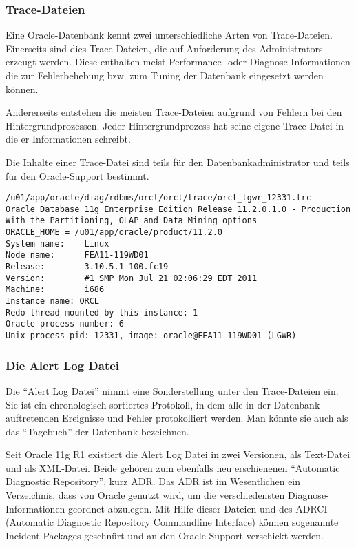           \subsubsection{Trace-Dateien}
            Eine Oracle-Datenbank kennt zwei unterschiedliche Arten von Trace-Dateien. Einerseits sind dies Trace-Dateien, die auf Anforderung des Administrators erzeugt werden. Diese enthalten meist Performance- oder Diagnose-Informationen die zur Fehlerbehebung bzw. zum Tuning der Datenbank eingesetzt werden können.

            Andererseits entstehen die meisten Trace-Dateien aufgrund von Fehlern bei den Hintergrundprozessen. Jeder Hintergrundprozess hat seine eigene Trace-Datei in die er Informationen schreibt.

						Die Inhalte einer Trace-Datei sind teils für den Datenbankadministrator und teils für den Oracle-Support bestimmt.
\clearpage
            \begin{lstlisting}[caption={Eine Tracedatei des Log Writers},
            label=orcl_lgwr_12331,emph={[9]ORACLE_HOME},emphstyle={[9]\color{black}},language=terminal]
/u01/app/oracle/diag/rdbms/orcl/orcl/trace/orcl_lgwr_12331.trc 
Oracle Database 11g Enterprise Edition Release 11.2.0.1.0 - Production
With the Partitioning, OLAP and Data Mining options
ORACLE_HOME = /u01/app/oracle/product/11.2.0
System name:    Linux
Node name:      FEA11-119WD01
Release:        3.10.5.1-100.fc19
Version:        #1 SMP Mon Jul 21 02:06:29 EDT 2011
Machine:        i686
Instance name: ORCL
Redo thread mounted by this instance: 1
Oracle process number: 6
Unix process pid: 12331, image: oracle@FEA11-119WD01 (LGWR)
            \end{lstlisting}
					\subsubsection{Die Alert Log Datei}
						Die \enquote{Alert Log Datei} nimmt eine Sonderstellung unter den Trace-Dateien ein. Sie ist ein chronologisch sortiertes Protokoll, in dem alle in der Datenbank auftretenden Ereignisse und Fehler protokolliert werden. Man könnte sie auch als das \enquote{Tagebuch} der Datenbank bezeichnen.

						Seit Oracle 11g R1 existiert die Alert Log Datei in zwei Versionen, als Text-Datei und als XML-Datei. Beide gehören zum ebenfalls neu erschienenen \enquote{Automatic Diagnostic Repository}, kurz ADR. Das ADR ist im Wesentlichen ein Verzeichnis, dass von Oracle genutzt wird, um die verschiedensten Diagnose-Informationen geordnet abzulegen. Mit Hilfe dieser Dateien und des ADRCI (Automatic Diagnostic Repository Commandline Interface) können sogenannte Incident Packages geschnürt und an den Oracle Support verschickt werden.

